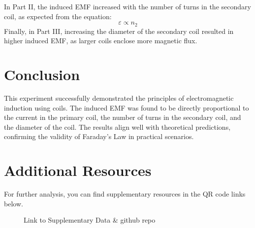 \documentclass[journal]{IEEEtran}
\begin{document}
In Part II, the induced EMF increased with the number of turns in the secondary coil, as expected from the equation:
\begin{equation}
    \varepsilon \propto n_2
\end{equation}
Finally, in Part III, increasing the diameter of the secondary coil resulted in higher induced EMF, as larger coils enclose more magnetic flux.

\section{Conclusion}
This experiment successfully demonstrated the principles of electromagnetic induction using coils. The induced EMF was found to be directly proportional to the current in the primary coil, the number of turns in the secondary coil, and the diameter of the coil. The results align well with theoretical predictions, confirming the validity of Faraday's Law in practical scenarios.

\section{Additional Resources}
For further analysis, you can find supplementary resources in the QR code links below.

\begin{figure}[H]
    \centering
    \caption{Link to Supplementary Data \& github repo}
\end{figure}
\end{document}
